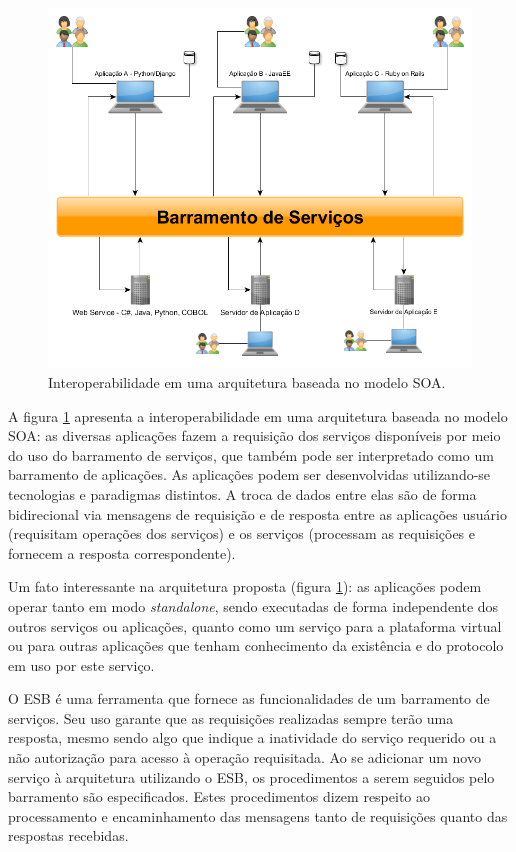 \begin{figure}[!hbt]
\centering
\includegraphics[scale=0.4]{figuras/barramento_interoperabilidade.png}
\caption{Interoperabilidade em uma arquitetura baseada no modelo SOA.}
\label{barramento_interoperabilidade}
\end{figure}

A figura \ref{barramento_interoperabilidade} apresenta a interoperabilidade em uma arquitetura baseada no modelo SOA:  as diversas aplicações fazem a requisição dos serviços disponíveis por meio do uso do barramento de serviços, que também pode ser interpretado como um barramento de aplicações. As aplicações podem ser desenvolvidas utilizando-se tecnologias e paradigmas distintos. A troca de dados entre elas são de forma bidirecional via mensagens de requisição e de resposta entre as aplicações usuário (requisitam operações dos serviços) e os serviços (processam as requisições e fornecem a resposta correspondente).

Um fato interessante na arquitetura proposta (figura \ref{barramento_interoperabilidade}): as aplicações podem operar tanto em modo \textit{standalone}, sendo executadas de forma independente dos outros serviços ou aplicações, quanto como um serviço para a plataforma virtual ou para outras aplicações que tenham conhecimento da existência e do protocolo em uso por este serviço.

O ESB é uma ferramenta que fornece as funcionalidades de um barramento de serviços. Seu uso garante que as requisições realizadas sempre terão uma resposta, mesmo sendo algo que indique a inatividade do serviço requerido ou a não autorização para acesso à operação requisitada. Ao se adicionar um novo serviço à arquitetura utilizando o ESB, os procedimentos a serem seguidos pelo barramento são especificados. Estes procedimentos dizem respeito ao processamento e encaminhamento das mensagens tanto de requisições quanto das respostas recebidas.

